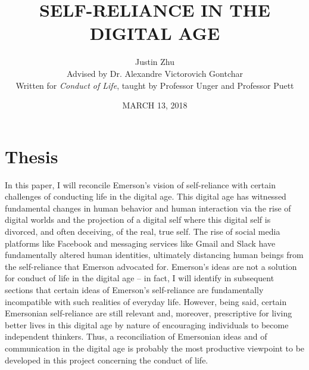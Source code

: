 \documentclass[12pt,letterpaper]{article}
\author{Justin Zhu \\ Advised by Dr. Alexandre Victorovich Gontchar \\ Written for \textit{Conduct of Life}, taught by Professor Unger and Professor Puett}
\title{SELF-RELIANCE IN THE DIGITAL AGE}
\date{MARCH 13, 2018}
\begin{document}
\maketitle
\pagebreak
\tableofcontents
\pagebreak
\section{Thesis}
In this paper, I will reconcile Emerson's vision of
self-reliance with certain challenges of conducting life in the digital age.
This digital age has witnessed fundamental changes
in human behavior and human interaction via the rise of
digital worlds and the projection of a digital self where
this digital self is divorced, and often deceiving, of the real, true self.    The rise
of social media platforms like Facebook and messaging services like Gmail and Slack have fundamentally altered human identities, ultimately distancing human beings from the self-reliance that Emerson advocated for.  Emerson's ideas are not a solution for conduct of life in the digital age -- in fact, I will identify in subsequent sections that certain ideas of Emerson's self-reliance are fundamentally incompatible with such realities of everyday life.  However, being said, certain Emersonian self-reliance are still relevant and, moreover, prescriptive for living better lives in this digital age by nature of encouraging individuals to become independent thinkers.  Thus, a reconciliation of Emersonian ideas and of communication in the digital age is probably the most productive viewpoint to be developed in this project concerning the conduct of life.
\end{document}
